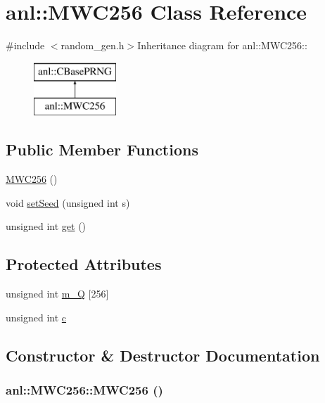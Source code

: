 \hypertarget{classanl_1_1MWC256}{
\section{anl::MWC256 Class Reference}
\label{classanl_1_1MWC256}
}


{\ttfamily \#include $<$random\_\-gen.h$>$}Inheritance diagram for anl::MWC256::\begin{figure}[H]
\begin{center}
\leavevmode
\includegraphics[height=2cm]{classanl_1_1MWC256}
\end{center}
\end{figure}
\subsection*{Public Member Functions}
\begin{DoxyCompactItemize}
\item 
\hyperlink{classanl_1_1MWC256_aa165451a17801c6aad232c9c52af46e0}{MWC256} ()
\item 
void \hyperlink{classanl_1_1MWC256_a21991854d1538735f7f47746c5277697}{setSeed} (unsigned int s)
\item 
unsigned int \hyperlink{classanl_1_1MWC256_a7857a5fc425c176743a88062aeddbedf}{get} ()
\end{DoxyCompactItemize}
\subsection*{Protected Attributes}
\begin{DoxyCompactItemize}
\item 
unsigned int \hyperlink{classanl_1_1MWC256_ad825932cee7866151d8237d13fcf6f5c}{m\_\-Q} \mbox{[}256\mbox{]}
\item 
unsigned int \hyperlink{classanl_1_1MWC256_a9072ebc5be10951ef6179cdfbbccd22a}{c}
\end{DoxyCompactItemize}


\subsection{Constructor \& Destructor Documentation}
\hypertarget{classanl_1_1MWC256_aa165451a17801c6aad232c9c52af46e0}{
\subsubsection[{MWC256}]{\setlength{\rightskip}{0pt plus 5cm}anl::MWC256::MWC256 ()}}
\label{classanl_1_1MWC256_aa165451a17801c6aad232c9c52af46e0}


